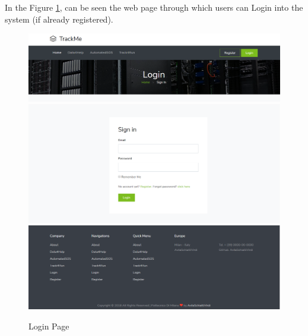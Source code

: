 \documentclass[a4paper, hidelinks, 12pt]{report}
\begin{document}
	In the Figure \ref{fig:Login}, can be seen the web page through which users can Login into the system (if already registered).
	
	\begin{figure}[H]
		\centering
		\includegraphics[scale=0.35]{UI/login1.png}
		\includegraphics[scale=0.35]{UI/login.png}
		\includegraphics[scale=0.35]{UI/d4h_home4.png}
		\caption[UI: Login Page]{Login Page}
		\label{fig:Login}
	\end{figure}
	
\end{document}
